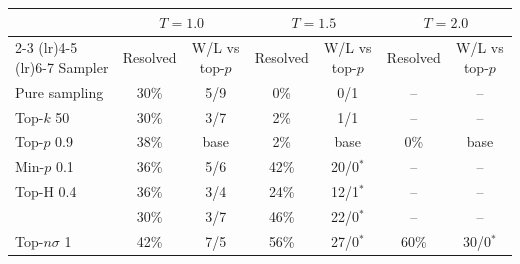 \begin{tabular}{lcccccc}
\toprule
 & \multicolumn{2}{c}{$T{=}1.0$} & \multicolumn{2}{c}{$T{=}1.5$} & \multicolumn{2}{c}{$T{=}2.0$} \\
\cmidrule(lr){2-3} \cmidrule(lr){4-5} \cmidrule(lr){6-7}
Sampler & Resolved & W/L vs top-$p$ & Resolved & W/L vs top-$p$ & Resolved & W/L vs top-$p$ \\
\midrule
Pure sampling & 30\% & 5/9 & 0\% & 0/1 & -- & -- \\
Top-$k$ 50 & 30\% & 3/7 & 2\% & 1/1 & -- & -- \\
Top-$p$ 0.9 & 38\% & base & 2\% & base & 0\% & base \\
Min-$p$ 0.1 & 36\% & 5/6 & 42\% & 20/0$^{*}$ & -- & -- \\
Top-H 0.4 & 36\% & 3/4 & 24\% & 12/1$^{*}$ & -- & -- \\
\pless{} & 30\% & 3/7 & 46\% & 22/0$^{*}$ & -- & -- \\
Top-$n\sigma$ 1 & 42\% & 7/5 & 56\% & 27/0$^{*}$ & 60\% & 30/0$^{*}$ \\
\bottomrule
\end{tabular}
